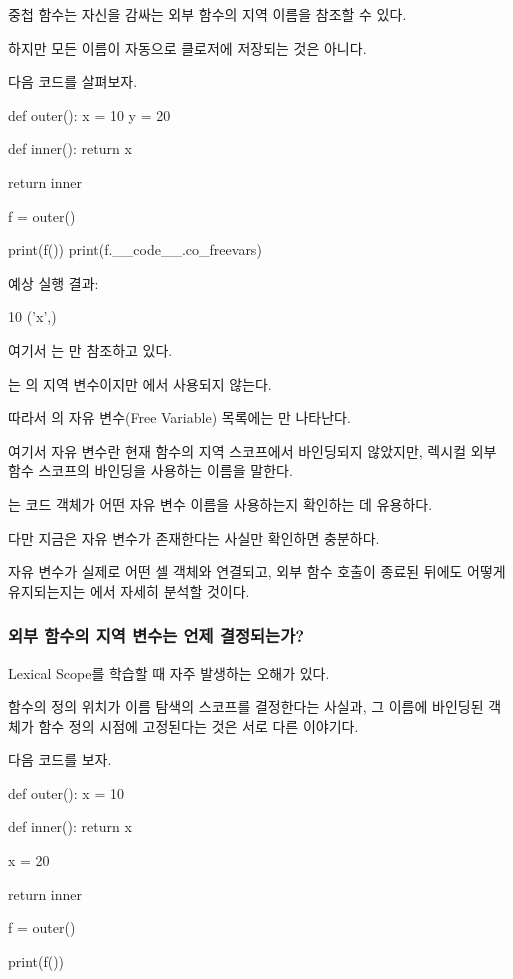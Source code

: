 중첩 함수는 자신을 감싸는 외부 함수의 지역 이름을 참조할 수 있다.

하지만 모든 이름이 자동으로 클로저에 저장되는 것은 아니다.

다음 코드를 살펴보자.

\begin{dhkcode}
def outer():
    x = 10
    y = 20

    def inner():
        return x

    return inner

f = outer()

print(f())
print(f.__code__.co_freevars)
\end{dhkcode}

예상 실행 결과:

\begin{dhkzsh}
10
('x',)
\end{dhkzsh}

여기서 는 만 참조하고 있다.

는 의 지역 변수이지만 에서 사용되지 않는다.

따라서 의 자유 변수(Free Variable) 목록에는 만 나타난다.

여기서 자유 변수란 현재 함수의 지역 스코프에서 바인딩되지 않았지만, 렉시컬 외부 함수 스코프의 바인딩을 사용하는 이름을 말한다.

는 코드 객체가 어떤 자유 변수 이름을 사용하는지 확인하는 데 유용하다.

다만 지금은 자유 변수가 존재한다는 사실만 확인하면 충분하다.

자유 변수가 실제로 어떤 셀 객체와 연결되고, 외부 함수 호출이 종료된 뒤에도 어떻게 유지되는지는 에서 자세히 분석할 것이다.

\subsubsection{외부 함수의 지역 변수는 언제 결정되는가?}

Lexical Scope를 학습할 때 자주 발생하는 오해가 있다.

함수의 정의 위치가 이름 탐색의 스코프를 결정한다는 사실과, 그 이름에 바인딩된 객체가 함수 정의 시점에 고정된다는 것은 서로 다른 이야기다.

다음 코드를 보자.

\begin{dhkcode}
def outer():
    x = 10

    def inner():
        return x

    x = 20

    return inner

f = outer()

print(f())
\end{dhkcode}

